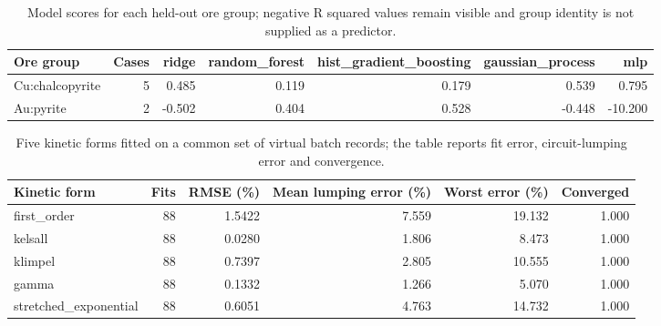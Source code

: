 \begin{table}[htbp]
\centering
\small
\caption{Model scores for each held-out ore group; negative R squared values remain visible and group identity is not supplied as a predictor.}
\label{tab:group-transfer-evidence}
\begin{tabular}{lrrrrrr}
\toprule
Ore group & Cases & ridge & random\_forest & hist\_gradient\_boosting & gaussian\_process & mlp \\
\midrule
Cu:chalcopyrite & 5 & 0.485 & 0.119 & 0.179 & 0.539 & 0.795 \\
Au:pyrite & 2 & -0.502 & 0.404 & 0.528 & -0.448 & -10.200 \\
\bottomrule
\end{tabular}
\end{table}
\begin{table}[htbp]
\centering
\small
\caption{Five kinetic forms fitted on a common set of virtual batch records; the table reports fit error, circuit-lumping error and convergence.}
\label{tab:kinetics}
\begin{tabular}{lrrrrr}
\toprule
Kinetic form & Fits & RMSE (\%) & Mean lumping error (\%) & Worst error (\%) & Converged \\
\midrule
first\_order & 88 & 1.5422 & 7.559 & 19.132 & 1.000 \\
kelsall & 88 & 0.0280 & 1.806 & 8.473 & 1.000 \\
klimpel & 88 & 0.7397 & 2.805 & 10.555 & 1.000 \\
gamma & 88 & 0.1332 & 1.266 & 5.070 & 1.000 \\
stretched\_exponential & 88 & 0.6051 & 4.763 & 14.732 & 1.000 \\
\bottomrule
\end{tabular}
\end{table}
